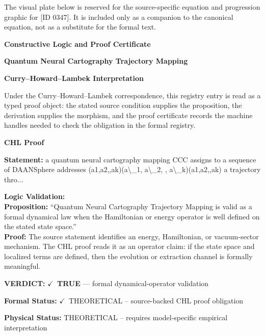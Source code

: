 \begingroup\footnotesize\sloppy
The visual plate below is reserved for the source-specific equation and progression graphic for [ID 0347]. It is included only as a companion to the canonical equation, not as a substitute for the formal text.
\par\endgroup
\ifTZPDarkEdition
{}
\fi

\clearpage
\begingroup\tzpsupportsetup
\noindent\textbf{\fontsize{10.8pt}{12.8pt}\selectfont [ID 0347] Constructive Logic and Proof Certificate}\par
\noindent\textbf{\fontsize{10pt}{12pt}\selectfont Quantum Neural Cartography Trajectory Mapping}\par
\vspace{0.45em}
\begingroup
\footnotesize
\setlength{\parskip}{0.22em}
\setlength{\parindent}{0pt}
\noindent\textbf{Curry--Howard--Lambek Interpretation}\par
Under the Curry--Howard--Lambek correspondence, this registry entry is read as a typed proof
object: the stated source condition supplies the proposition, the derivation supplies the
morphism, and the proof certificate records the machine handles needed to check the obligation
in the formal registry.

\vspace{0.45em}
\noindent\textbf{CHL Proof}\par
\textbf{Statement:} a quantum neural cartography mapping CCC assigns to a sequence of DAANSphere addresses
(a1,a2,,ak)(a\textbackslash{}\_1, a\textbackslash{}\_2, , a\textbackslash{}\_k)(a1,a2,,ak) a trajectory thro...

\textbf{Logic Validation:}\\
\textbf{Proposition:} ``Quantum Neural Cartography Trajectory Mapping is valid as a formal dynamical law when
the Hamiltonian or energy operator is well defined on the stated state space.''\\
\textbf{Proof:} The source statement identifies an energy, Hamiltonian, or vacuum-sector mechanism. The
CHL proof reads it as an operator claim: if the state space and localized terms are
defined, then the evolution or extraction channel is formally meaningful.

\textbf{VERDICT:} \ensuremath{\checkmark}\ \textbf{TRUE} --- formal dynamical-operator validation

\textbf{Formal Status:} \ensuremath{\checkmark}\ THEORETICAL -- source-backed CHL proof obligation

\textbf{Physical Status:} THEORETICAL -- requires model-specific empirical interpretation
\par\vspace{0.45em}
\par
\ifTZPDarkEdition
{}
\fi
\endgroup
\endgroup
